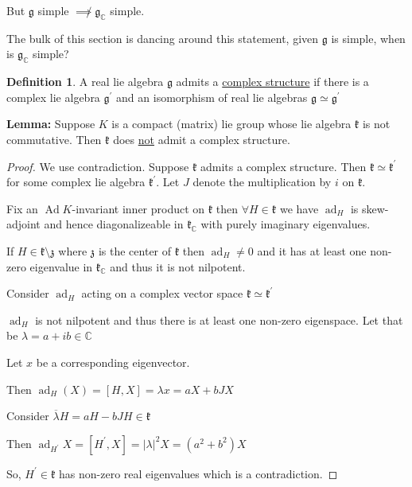 \documentclass{article}
\theoremstyle{definition}
\newtheorem{definition}{Definition}
\newcommand{\ad}{\operatorname{ad}}
\newcommand{\Ad}{\operatorname{Ad}}
\begin{document}
But \(\mathfrak{g}\) simple \(\not\implies \mathfrak{g}_\mathbb{C}  \)  simple.

The bulk of this section is dancing around this statement, given \(\mathfrak{g}\) is simple, when is \(\mathfrak{g}_\mathbb{C} \) simple?


\begin{definition}
    A real lie algebra \(\mathfrak{g} \) admits a \underline{complex structure} if there is a complex lie algebra \(\mathfrak{g}^{\prime} \) and an isomorphism of real lie algebras \(\mathfrak{g} \simeq \mathfrak{g}^{\prime}  \)  
\end{definition}

\textbf{Lemma:} Suppose \(K\) is a compact (matrix) lie group whose lie algebra \(\mathfrak{k} \) is not commutative. Then \(\mathfrak{k}\)  does \underline{not} admit a complex structure.

\begin{proof}
    We use contradiction. Suppose \(\mathfrak{k} \) admits a complex structure. Then \(\mathfrak{k} \simeq \mathfrak{k^{\prime}} \) for some complex lie algebra \(\mathfrak{k}^{\prime}  \). Let \(J\) denote the multiplication by \(i\) on \(\mathfrak{k}\).
    
    Fix an \(\Ad K\)-invariant inner product on \(\mathfrak{k} \) then \(\forall H\in \mathfrak{k} \) we have \(\ad_H\) is skew-adjoint and hence diagonalizeable in \(\mathfrak{k}_\mathbb{C} \)  with purely imaginary eigenvalues.

    If \(H\in \mathfrak{k} \setminus \mathfrak{z}  \) where \(\mathfrak{z} \) is the center of \(\mathfrak{k} \) then \(\ad_H \neq 0\) and it has at least one non-zero eigenvalue in \(\mathfrak{k}_\mathbb{C} \) and thus it is not nilpotent.
    
    Consider \(\ad_H\) acting on a complex vector space \(\mathfrak{k} \simeq \mathfrak{k}^{\prime}  \) 

    \(\ad_H\) is not nilpotent and thus there is at least one non-zero eigenspace. Let that be \(\lambda = a + i b \in \mathbb{C}\) 

    Let \(x\) be a corresponding eigenvector.

    Then \(\ad_H(X)=[H,X]=\lambda x = aX+bJX\) 

    Consider \(\overline{\lambda }H = aH-bJH\in \mathfrak{k}  \) 

    Then \(\ad_{H^{\prime} }X=[H^{\prime} ,X]=\vert \lambda \vert^2 X=(a^2 + b^2)X \)
    
    So, \(H^{\prime} \in \mathfrak{k} \) has non-zero real eigenvalues which is a contradiction. 

\end{proof}
\end{document}

